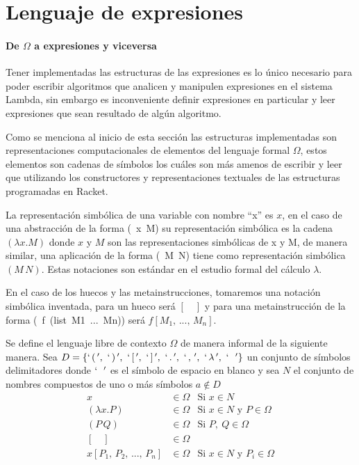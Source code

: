 \documentclass[letterpaper, twoside, openright, 11pt]{book}%
\begin{document}
\section{Lenguaje de expresiones}

\paragraph{De \( Ω \) a expresiones y viceversa} Tener implementadas las estructuras de las expresiones es lo único necesario para poder escribir algoritmos que analicen y manipulen expresiones en el sistema {\Tt{}Lambda\nwendquote}, sin embargo es inconveniente definir expresiones en particular y leer expresiones que sean resultado de algún algoritmo.

Como se menciona al inicio de esta sección las estructuras implementadas son representaciones computacionales de elementos del lenguaje formal \( Ω \), estos elementos son cadenas de símbolos los cuáles son más amenos de escribir y leer que utilizando los constructores y representaciones textuales de las estructuras programadas en {\Tt{}Racket\nwendquote}.

La representación simbólica de una variable con nombre ``{\Tt{}x\nwendquote}'' es \( x \), en el caso de una abstracción de la forma {\Tt{}(\ x\ M)\nwendquote} su representación simbólica es la cadena \( (λx.M) \) donde \( x \) y \( M \) son las representaciones simbólicas de {\Tt{}x\nwendquote} y {\Tt{}M\nwendquote}, de manera similar, una aplicación de la forma {\Tt{}(\ M\ N)\nwendquote} tiene como representación simbólica \( (M\, N) \). Estas notaciones son estándar en el estudio formal del cálculo \( λ \).

En el caso de los huecos y las metainstrucciones, tomaremos una notación simbólica inventada, para un hueco será \( [\quad ] \) y para una metainstrucción de la forma {\Tt{}(\ f\ (list\ M1\ ...\ Mn))\nwendquote} será \( f[M_{1},\, ...,\, M_{n}] \).

Se define el lenguaje libre de contexto \( Ω \) de manera informal de la siguiente manera. Sea \( D = \left\{ `\, (\, ',\ `\, )\, ',\ `\, [\, ',\ `\, ]\, ',\ `\, .\, ',\ `\, ,\, ',\ `\, \lambda\, ',\ `\, \, \, \, ' \right\} \) un conjunto de símbolos delimitadores donde \( `\, \, \, \, ' \) es el símbolo de espacio en blanco y sea \( N \) el conjunto de nombres compuestos de uno o más símbolos \( a \not\in D \)
\begin{align*}
  x &\in Ω &\text{Si } x \in N \\
  (λx.P) &\in Ω &\text{Si } x \in N \text{ y } P \in Ω \\
  (P\, Q) &\in Ω &\text{Si } P,\ Q \in Ω \\
  [\quad ] &\in Ω \\
  x[P_{1},\, P_{2},\, ...,\, P_{n}] &\in Ω &\text{Si } x \in N \text{ y } P_{i} \in Ω
\end{align*}
\end{document}
